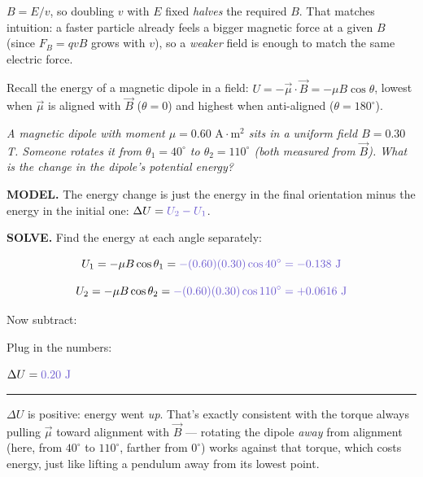 \documentclass[12pt]{article}
\newcommand{\eqline}[2][-0.5mm]{%
  \par\vspace{1mm}\noindent #2\par\vspace{#1}%
  \noindent\textcolor{rulehue}{\rule{\linewidth}{0.5pt}}\par\vspace{4mm}%
}
\newcommand{\ANS}[1]{\textcolor{accent}{#1}}
\begin{document}

{\small\color{accent} $B=E/v$, so doubling $v$ with $E$ fixed
\emph{halves} the required $B$. That matches intuition: a faster
particle already feels a bigger magnetic force at a given $B$ (since
$F_B=qvB$ grows with $v$), so a \emph{weaker} field is enough to match
the same electric force.}


Recall the energy of a magnetic dipole in a field: $U=-\vec\mu\cdot
\vec B=-\mu B\cos\theta$, lowest when $\vec\mu$ is aligned with
$\vec B$ ($\theta=0$) and highest when anti-aligned ($\theta=180^\circ$).

\textit{A magnetic dipole with moment $\mu=0.60\text{ A}{\cdot}\text{m}^2$
sits in a uniform field $B=0.30$ T. Someone rotates it from
$\theta_1=40^\circ$ to $\theta_2=110^\circ$ (both measured from
$\vec B$). What is the \emph{change} in the dipole's potential energy?}

\textbf{MODEL.} The energy change is just the energy in the final
orientation minus the energy in the initial one:
$\Delta U = \ANS{U_2-U_1}$.

\textbf{SOLVE.} Find the energy at each angle separately:

\[
U_1 = -\mu B\cos\theta_1 = \ANS{-(0.60)(0.30)\cos40^\circ =
-0.138\text{ J}}
\]

\[
U_2 = -\mu B\cos\theta_2 = \ANS{-(0.60)(0.30)\cos110^\circ =
+0.0616\text{ J}}
\]

Now subtract:

\result[1.8cm]{$\Delta U = U_2-U_1 = \ANS{0.0616-(-0.138)}$}

Plug in the numbers:

\eqline[0.2cm]{$\Delta U = \ANS{0.20\text{ J}}$}


{\small\color{accent} $\Delta U$ is positive: energy went \emph{up}.
That's exactly consistent with the torque always pulling $\vec\mu$
toward alignment with $\vec B$ --- rotating the dipole \emph{away}
from alignment (here, from $40^\circ$ to $110^\circ$, farther from
$0^\circ$) works against that torque, which costs energy, just like
lifting a pendulum away from its lowest point.}
\end{document}
